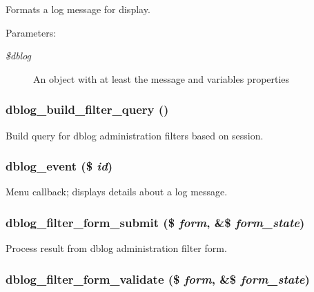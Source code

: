 Formats a log message for display.

\begin{Desc}
\item[Parameters:]
\begin{description}
\item[{\em \$dblog}]An object with at least the message and variables properties \end{description}
\end{Desc}
\hypertarget{dblog_8admin_8inc_aeb52aeee42e8fe89e517a509ee30b19}{
\subsubsection[{dblog\_\-build\_\-filter\_\-query}]{\setlength{\rightskip}{0pt plus 5cm}dblog\_\-build\_\-filter\_\-query ()}}
\label{dblog_8admin_8inc_aeb52aeee42e8fe89e517a509ee30b19}


Build query for dblog administration filters based on session. \hypertarget{dblog_8admin_8inc_044370b32b7cc5cace449cb62bf6c007}{
\subsubsection[{dblog\_\-event}]{\setlength{\rightskip}{0pt plus 5cm}dblog\_\-event (\$ {\em id})}}
\label{dblog_8admin_8inc_044370b32b7cc5cace449cb62bf6c007}


Menu callback; displays details about a log message. \hypertarget{dblog_8admin_8inc_817953760089fe9caf59d187d3784433}{
\subsubsection[{dblog\_\-filter\_\-form\_\-submit}]{\setlength{\rightskip}{0pt plus 5cm}dblog\_\-filter\_\-form\_\-submit (\$ {\em form}, \/  \&\$ {\em form\_\-state})}}
\label{dblog_8admin_8inc_817953760089fe9caf59d187d3784433}


Process result from dblog administration filter form. \hypertarget{dblog_8admin_8inc_8f88e6f1bf9010761546bbad59189b0f}{
\subsubsection[{dblog\_\-filter\_\-form\_\-validate}]{\setlength{\rightskip}{0pt plus 5cm}dblog\_\-filter\_\-form\_\-validate (\$ {\em form}, \/  \&\$ {\em form\_\-state})}}
\label{dblog_8admin_8inc_8f88e6f1bf9010761546bbad59189b0f}



